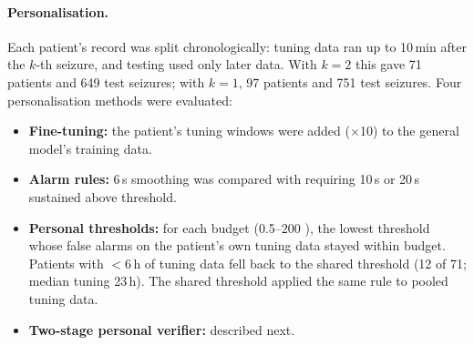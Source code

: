 \paragraph{Personalisation.} Each patient's record was split chronologically: tuning data ran up to 10\,min after the $k$-th seizure, and testing used only later data. With $k=2$ this gave 71 patients and 649 test seizures; with $k=1$, 97 patients and 751 test seizures. Four personalisation methods were evaluated:
\begin{itemize}
\item \textbf{Fine-tuning:} the patient's tuning windows were added ($\times$10) to the general model's training data.
\item \textbf{Alarm rules:} 6\,s smoothing was compared with requiring 10\,s or 20\,s sustained above threshold.
\item \textbf{Personal thresholds:} for each budget (0.5--200 \FAd), the lowest threshold whose false alarms on the patient's own tuning data stayed within budget. Patients with $<$6\,h of tuning data fell back to the shared threshold (12 of 71; median tuning 23\,h). The shared threshold applied the same rule to pooled tuning data.
\item \textbf{Two-stage personal verifier:} described next.
\end{itemize}

